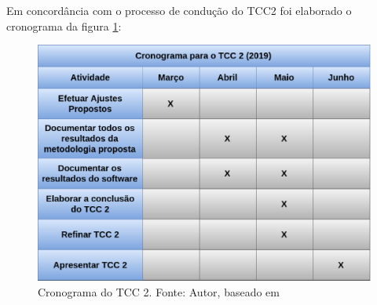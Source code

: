 Em concordância com o processo de condução do TCC2 foi elaborado o cronograma da figura \ref{fig:cronograma_tcc2}:

\begin{figure}[h!]
	\centering
  \includegraphics[keepaspectratio=true,scale=0.4]{figuras/cronograma_tcc2.eps}
  \caption[Cronograma do TCC 2.]{Cronograma do TCC 2. Fonte: Autor, baseado em \cite{leonardo}}
	\label{fig:cronograma_tcc2}
\end{figure}
